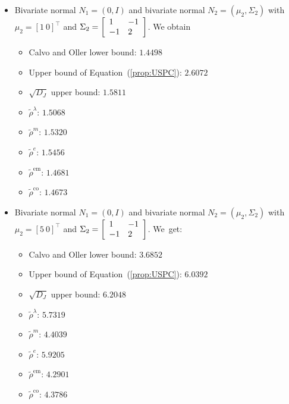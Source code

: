 \documentclass[entropy,article,accept,oneauthor,pdftex,entropy]{Definitions/mdpi}
\def\mattwotwo#1#2#3#4{{\left[\begin{array}{ll}#1 & #2\cr #3 & #4\end{array}\right]}}
\begin{document}
\begin{Example}
\begin{itemize}
\item Bivariate normal $N_1=(0,I)$ and bivariate normal $N_2=(\mu_2,\Sigma_2)$ with $\mu_2=[1\ 0]^\top$ and 
$\Sigma_2=\mattwotwo{1}{-1}{-1}{2}$.
We obtain
\begin{itemize}
	\item Calvo and Oller lower bound: {\bf $1.4498$}
	\item Upper bound of Equation~(\ref{prop:USPC}): $2.6072$
	\item $\sqrt{D_J}$ upper bound: {\bf $1.5811$}
	\item $\tilde\rho^\lambda$: $1.5068$
	\item $\tilde\rho^m$: $1.5320$
	\item $\tilde\rho^e$: $1.5456$
	\item $\tilde\rho^{\mathrm{em}}$: $1.4681$
	\item $\tilde\rho^{\mathrm{co}}$: {\bf $1.4673$}
\end{itemize}
 \item Bivariate normal $N_1=(0,I)$ and bivariate normal $N_2=(\mu_2,\Sigma_2)$ with $\mu_2=[5\ 0]^\top$ and 
$\Sigma_2=\mattwotwo{1}{-1}{-1}{2}$.
We~get:
\begin{itemize}
	\item Calvo and Oller lower bound: {\bf $3.6852$}
	\item Upper bound of Equation~(\ref{prop:USPC}): {\bf $6.0392$}
	\item $\sqrt{D_J}$ upper bound: $6.2048$
	\item $\tilde\rho^\lambda$: $5.7319$
	\item $\tilde\rho^m$: $4.4039$
	\item $\tilde\rho^e$: $5.9205$
	\item $\tilde\rho^{\mathrm{em}}$: {\bf $4.2901$}
	\item $\tilde\rho^{\mathrm{co}}$: {$4.3786$}
\end{itemize}
\end{itemize}
\end{Example}



\end{document}
